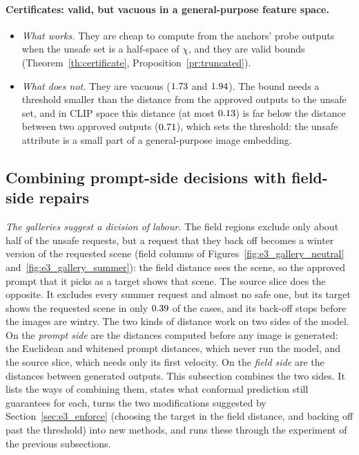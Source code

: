 \documentclass{article}
\theoremstyle{plain}
\theoremstyle{remark}
\begin{document}
\paragraph{Certificates: valid, but vacuous in a general-purpose feature space.}
\begin{itemize}
\item \emph{What works.} They are cheap to compute from the anchors' probe outputs when the unsafe set is a half-space of $\chi$, and
they are valid bounds (Theorem~\ref{th:certificate}, Proposition~\ref{pr:truncated}).
\item \emph{What does not.} They are vacuous ($1.73$ and $1.94$). The bound needs a threshold smaller than the
distance from the approved outputs to the unsafe set, and in CLIP space this distance (at most $0.13$) is far below the
distance between two approved outputs ($0.71$), which sets the threshold: the unsafe attribute is a small part of a
general-purpose image embedding.
\end{itemize}

\subsection{Combining prompt-side decisions with field-side repairs}\label{sec:e3_combined}

\emph{The galleries suggest a division of labour.} The field regions exclude only about half of the unsafe requests, but a request
that they back off becomes a winter version of the requested scene (field columns of Figures~\ref{fig:e3_gallery_neutral}
and~\ref{fig:e3_gallery_summer}): the field distance sees the scene, so the approved prompt that it picks as a target shows that
scene. The source slice does the opposite. It excludes every summer request and almost no safe one, but its target shows the
requested scene in only $0.39$ of the cases, and its back-off stops before the images are wintry. The two kinds of
distance work on two sides of the model. On the \emph{prompt side} are the distances computed before any image is generated: the
Euclidean and whitened prompt distances, which never run the model, and the source slice, which needs only its first velocity.
On the \emph{field side} are the distances between generated outputs. This subsection combines the two sides. It lists the ways of combining them, states what conformal prediction still guarantees for
each, turns the two modifications suggested by Section~\ref{sec:e3_enforce} (choosing the target in the field distance, and backing
off past the threshold) into new methods, and runs these through the experiment of the previous subsections.
\end{document}

